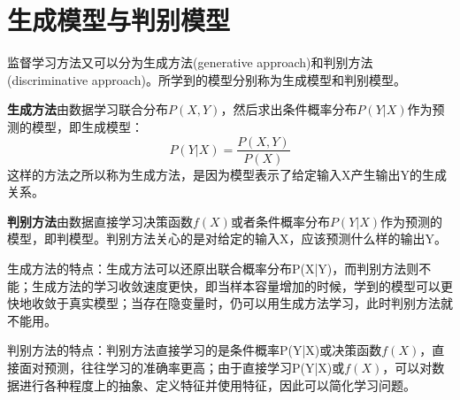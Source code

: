 \section{生成模型与判别模型}
监督学习方法又可以分为生成方法(generative approach)和判别方法(discriminative approach)。所学到的模型分别称为生成模型和判别模型。

\textbf{生成方法}由数据学习联合分布$P(X,Y)$，然后求出条件概率分布$P(Y|X)$作为预测的模型，即生成模型：
\begin{equation}
	P(Y|X) = \frac{P(X,Y)}{P(X)}
\end{equation}
这样的方法之所以称为生成方法，是因为模型表示了给定输入X产生输出Y的生成关系。

\textbf{判别方法}由数据直接学习决策函数$f(X)$或者条件概率分布$P(Y|X)$作为预测的模型，即判模型。判别方法关心的是对给定的输入X，应该预测什么样的输出Y。

生成方法的特点：生成方法可以还原出联合概率分布P(X|Y)，而判别方法则不能；生成方法的学习收敛速度更快，即当样本容量增加的时候，学到的模型可以更快地收敛于真实模型；当存在隐变量时，仍可以用生成方法学习，此时判别方法就不能用。

判别方法的特点：判别方法直接学习的是条件概率P(Y|X)或决策函数$f(X)$，直接面对预测，往往学习的准确率更高；由于直接学习P(Y|X)或$f(X)$，可以对数据进行各种程度上的抽象、定义特征并使用特征，因此可以简化学习问题。